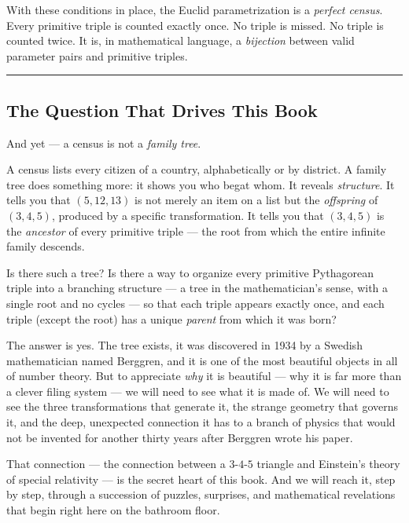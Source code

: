 \documentclass[11pt,openany]{book}
\theoremstyle{definition}
\theoremstyle{plain}
\theoremstyle{remark}
\begin{document}
With these conditions in place, the Euclid parametrization is a \textit{perfect census}. Every primitive triple is counted exactly once. No triple is missed. No triple is counted twice. It is, in mathematical language, a \textit{bijection} between valid parameter pairs and primitive triples.

\bigskip\noindent\rule{\textwidth}{0.4pt}\bigskip


\subsection*{The Question That Drives This Book}


And yet — a census is not a \textit{family tree}.

A census lists every citizen of a country, alphabetically or by district. A family tree does something more: it shows you who begat whom. It reveals \textit{structure}. It tells you that $(5, 12, 13)$ is not merely an item on a list but the \textit{offspring} of $(3, 4, 5)$, produced by a specific transformation. It tells you that $(3, 4, 5)$ is the \textit{ancestor} of every primitive triple — the root from which the entire infinite family descends.

Is there such a tree? Is there a way to organize every primitive Pythagorean triple into a branching structure — a tree in the mathematician's sense, with a single root and no cycles — so that each triple appears exactly once, and each triple (except the root) has a unique \textit{parent} from which it was born?

The answer is yes. The tree exists, it was discovered in 1934 by a Swedish mathematician named Berggren, and it is one of the most beautiful objects in all of number theory. But to appreciate \textit{why} it is beautiful — why it is far more than a clever filing system — we will need to see what it is made of. We will need to see the three transformations that generate it, the strange geometry that governs it, and the deep, unexpected connection it has to a branch of physics that would not be invented for another thirty years after Berggren wrote his paper.

That connection — the connection between a $3$-$4$-$5$ triangle and Einstein's theory of special relativity — is the secret heart of this book. And we will reach it, step by step, through a succession of puzzles, surprises, and mathematical revelations that begin right here on the bathroom floor.
\end{document}
